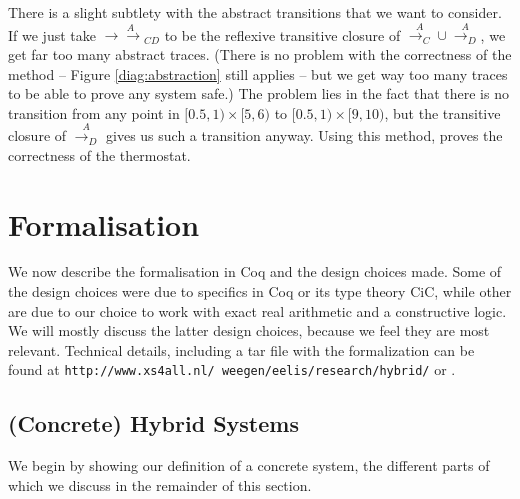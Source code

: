 \documentclass[runningheads]{llncs}
\newcommand{\ADAM}[1] {\todo{\textsc{Adam says}: #1}}
\newcommand{\doubleheadrightarrow}{\mathrel{\rightarrow\!\!\!\!\rightarrow}}
\newcommand{\attrans}{\stackrel{A}{\doubleheadrightarrow_{CD}}}
\newcommand{\acontrans}{\stackrel{A}{\rightarrow_C}}
\newcommand{\adistrans}{\stackrel{A}{\rightarrow_D}}
\begin{document}
There is a slight subtlety with the abstract transitions that we want
to consider. If we just take $\attrans$ to be the reflexive transitive
closure of $\acontrans \cup \adistrans$, we get far too many abstract
traces. (There is no problem with the correctness of the method --
Figure \ref{diag:abstraction} still applies -- but we get way too many
traces to be able to prove any system safe.) The problem lies in the
fact that there is no transition from any point in $[0.5,1)
  \times[5,6)$ to $[0.5,1) \times[9,10)$, but the transitive closure
        of $\adistrans$ gives us such a transition anyway. 
Using this method, \cite{alur} proves the correctness of the thermostat. 

\section{Formalisation}
We now describe the formalisation in Coq and the design choices
made. Some of the design choices were due to specifics in Coq or its
type theory CiC, while other are due to our choice to work with exact
real arithmetic and a constructive logic. We will mostly discuss the
latter design choices, because we feel they are most relevant. Technical details, including a tar file with the formalization can be found at {\tt http://www.xs4all.nl/~weegen/eelis/research/hybrid/} or \cite{hybrid-techreport}.

\subsection{(Concrete) Hybrid Systems}
\label{concrete}

We begin by showing our definition of a concrete system, the different
parts of which we discuss in the remainder of this section.
\end{document}
